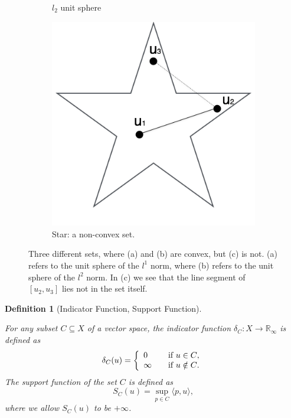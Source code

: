 \documentclass{scrreprt}
\newtheorem{definition}[theorem]{Definition}
\begin{document}
\begin{figure}[!ht]
\begin{subfigure}[b]{0.3\textwidth}
                \caption{$l_{2}$ unit sphere}
            \end{subfigure}
            \begin{subfigure}[b]{0.3\textwidth}
                \includegraphics[width=\textwidth]{img/non_convex_set.png}
                \caption{Star: a non-convex set.}
            \end{subfigure}
            \caption[Examples of convex sets.]{Three different sets, where (a) and (b) are convex, but (c) is not. (a) refers to the unit sphere of the $l^{1}$ norm, where (b) refers to the unit sphere of the $l^{2}$ norm. In (c) we see that the line segment of $[u_{2}, u_{3}]$ lies not in the set itself.}
            \label{fig:convex_and_non_convex_sets}
        \end{figure}

        \begin{definition}[Indicator Function, Support Function] %
        \label{def:indicator_function}

            For any subset $C \subseteq X$ of a vector space, the indicator function $\delta_{C}: X \longrightarrow \mathbb{R}_{\infty}$ is defined as
                $$
                    \delta_{C}(u) =
                    \left\{
                        \begin{array}{l l}
                          0      & \quad \text{if $u \in C$}, \\
                          \infty & \quad \text{if $u \notin C$}.
                        \end{array}
                    \right.
                $$
            The support function of the set $C$ is defined as
                $$
                    S_{C}(u) = \sup_{p \in C} \langle p, u \rangle,
                $$
            where we allow $S_{C}(u)$ to be $+\infty$.
     
        \end{definition}
\end{document}
